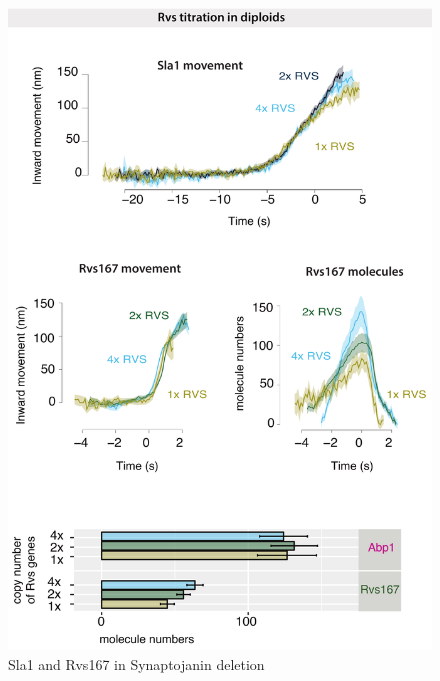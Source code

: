 		\begin{figure}
		\centering
		\includegraphics[width=17cm,height=17cm,keepaspectratio]{figures/results_final/protein_friction2}
		\caption{Sla1 and Rvs167 in Synaptojanin deletion \label{fig5}}
		\end{figure}
	
